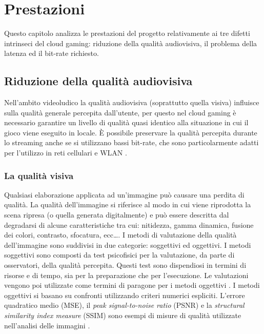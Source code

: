 %
%

\chapter{Prestazioni} \label{cap:cap4}
Questo capitolo analizza le prestazioni del progetto relativamente ai tre difetti intrinseci del cloud gaming: riduzione della qualità audiovisiva, il problema della latenza ed il bit-rate richiesto.



\section{Riduzione della qualità audiovisiva}
Nell'ambito videoludico la qualità audiovisiva (soprattutto quella visiva) influisce sulla qualità generale percepita dall'utente, per questo nel cloud gaming è necessario garantire un livello di qualità quasi identico alla situazione in cui il gioco viene eseguito in locale. È possibile preservare la qualità percepita durante lo streaming anche se si utilizzano bassi bit-rate, che sono particolarmente adatti per l'utilizzo in reti cellulari e WLAN \parencite{VideoAndMultimediaTransmissionsOverCellularNetworks}.



\subsection{La qualità visiva}
Qualsiasi elaborazione applicata ad un'immagine può causare una perdita di qualità. La qualità dell'immagine si riferisce al modo in cui viene riprodotta la scena ripresa (o quella generata digitalmente) e può essere descritta dal degradarsi di alcune caratteristiche tra cui: nitidezza, gamma dinamica, fusione dei colori, contrasto, sfocatura, ecc\dots. I metodi di valutazione della qualità dell'immagine sono suddivisi in due categorie: soggettivi ed oggettivi. I metodi soggettivi sono composti da test psicofisici per la valutazione, da parte di osservatori, della qualità percepita. Questi test sono dispendiosi in termini di risorse e di tempo, sia per la preparazione che per l'esecuzione. Le valutazioni vengono poi utilizzate come termini di paragone per i metodi oggettivi \parencite{AnewcombinedPSNRforobjectivevideoqualityassessment}. I metodi oggettivi si basano su confronti utilizzando criteri numerici espliciti. L'errore quadratico medio (MSE), il \textit{peak signal-to-noise ratio} (PSNR) e la \textit{structural similarity index measure} (SSIM) sono esempi di misure di qualità utilizzate nell'analisi delle immagini \parencite{relationship_PSNR_and_SSI}.



